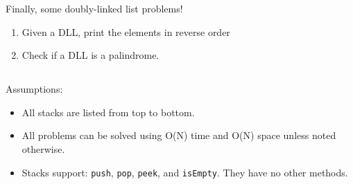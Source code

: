 \documentclass{article}
\begin{document}
\noindent Finally, some doubly-linked list problems!

\begin{enumerate}

\begin{lstlisting}[language=Java]
Node {
    int data;
    Node next, prev;
}
\end{lstlisting}

\setcounter{enumi}{8}

\item Given a DLL, print the elements in reverse order

\item Check if a DLL is a palindrome.

    
\end{enumerate}

\subsection*{}

Assumptions:

\begin{itemize}
  \item All stacks are listed from top to bottom.
  \item All problems can be solved using O(N) time and O(N) space unless noted otherwise.
  \item Stacks support: \texttt{push}, \texttt{pop}, \texttt{peek}, and \texttt{isEmpty}. They have no other methods.
\end{itemize}
    
\subsection*{}
\end{document}
